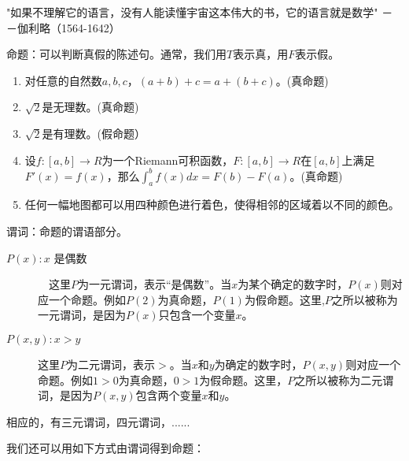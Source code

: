 \documentclass{beamer}
\begin{document}
\begin{CJK*}{UTF8}{gbsn}
\begin{frame}
\end{frame}
\begin{frame}
  "如果不理解它的语言，没有人能读懂宇宙这本伟大的书，它的语言就是数学"
  －－伽利略（1564-1642）
\end{frame}
\begin{frame}
    命题：可以判断真假的陈述句。通常，我们用$T$表示真，用$F$表示假。
  \begin{Ex}\quad   
    \begin{enumerate}
    \item 对任意的自然数$a,b,c$，$(a + b) + c = a + (b + c)$。(真命题)
    \item $\sqrt{2}$是无理数。(真命题)
    \item $\sqrt{2}$是有理数。(假命题）
    \item 设$f:[a,b] \to R$为一个Riemann可积函数，$F:[a,b] \to R$在$[a,b]$上满足$F'(x)=f(x)$，那么$\int_{a}^{b}f(x)dx = F(b) - F(a)$。(真命题)
    \item 任何一幅地图都可以用四种颜色进行着色，使得相邻的区域着以不同的颜色。
    \end{enumerate}
  \end{Ex}
\end{frame}

\begin{frame}
  \centering

\end{frame}

\begin{frame}
    谓词：命题的谓语部分。
  
  \begin{Ex}\quad
    
    \begin{description}
    \item     [$P(x): x$ 是偶数]　这里$P$为一元谓词，表示“是偶数”。当$x$为某个确定的数字时，$P(x)$则对应一个命题。例如$P(2)$为真命题，$P(1)$为假命题。这里,$P$之所以被称为一元谓词，是因为$P(x)$只包含一个变量$x$。
    \item     [$P(x,y): x >y$]  这里$P$为二元谓词，表示$>$。当$x$和$y$为确定的数字时，$P(x,y)$则对应一个命题。例如$1>0$为真命题，$0>1$为假命题。这里，$P$之所以被称为二元谓词，是因为$P(x,y)$包含两个变量$x$和$y$。
    \end{description}
相应的，有三元谓词，四元谓词，......
\end{Ex}
\end{frame}
\begin{frame}
  我们还可以用如下方式由谓词得到命题：


\end{frame}
\end{CJK*}
\end{document}
